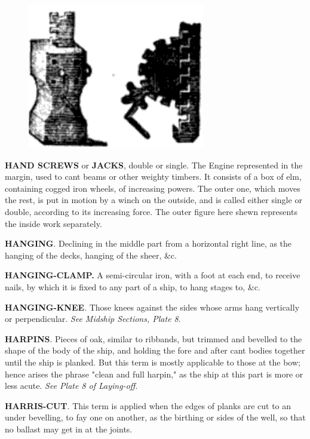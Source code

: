\begin{figure}
\begin{center}
\includegraphics[scale=0.5]{pictures/hand_screw}
\end{center}
\end{figure} \textbf{HAND SCREWS} or \textbf{JACKS}, double or single. The Engine  represented in the margin, used to cant beams or other weighty timbers. It consists of a box of elm, containing cogged iron wheels, of increasing powers. The outer one, which moves the rest, is put in motion by a winch on the outside, and is called either single or double, according to its increasing force. The outer figure here shewn represents the inside work separately. 

\textbf{HANGING}. Declining in the middle part from a horizontal right line, as the hanging of the decks, hanging of the sheer, \&c. 

\textbf{HANGING-CLAMP.} A semi-circular iron, with a foot at each end, to receive nails, by which it is fixed to any part of a ship, to hang stages to, \&c. 

\textbf{HANGING-KNEE}. Those knees against the sides whose arms hang vertically or perpendicular. \textit{See Midship Sections, Plate 8}. 

\textbf{HARPINS}. Pieces of oak, similar to ribbands, but trimmed and bevelled to the shape of the body of the ship, and holding the fore and after cant bodies together until the ship is planked. But this term is mostly applicable to those at the bow; hence arises the phrase "clean and full harpin," as the ship at this part is more or less acute. \textit{See Plate 8 of Laying-off}. 

\textbf{HARRIS-CUT}. This term is applied when the edges of planks are cut to an under bevelling, to fay one on another, as the birthing or sides of the well, so that no ballast may get in at the joints. 

